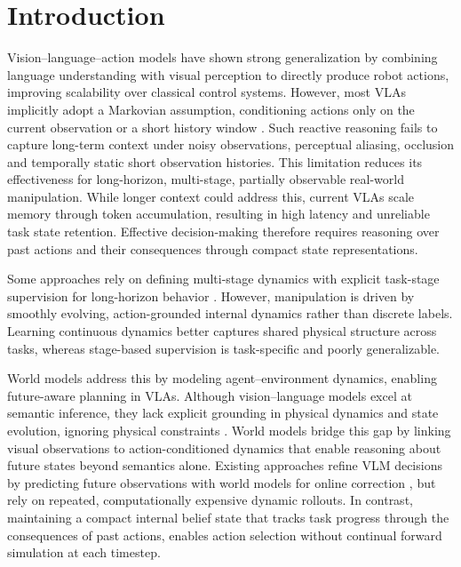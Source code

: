 \documentclass[conference]{IEEEtran}
\begin{document}
\section{Introduction}
Vision–language–action models \cite{kim2024openvla,ye2025vla,zitkovich2023rt} have shown strong generalization by combining language understanding with visual perception to directly produce robot actions, improving scalability over classical control systems. However, most VLAs implicitly adopt a Markovian assumption, conditioning actions only on the current observation or a short history window \cite{jang2025contextvla,lin2025hif,wang2025lola}. Such reactive reasoning fails to capture long-term context under noisy observations, perceptual aliasing, occlusion and temporally static short observation histories. This limitation reduces its effectiveness for long-horizon, multi-stage, partially observable real-world manipulation. While longer context could address this, current VLAs scale memory through token accumulation, resulting in high latency and unreliable task state retention. Effective decision-making therefore requires reasoning over past actions and their consequences through compact state representations. 

Some approaches rely on defining multi-stage dynamics with explicit task-stage supervision for long-horizon behavior \cite{xu2025stare,ji2025robobrain}. However, manipulation is driven by smoothly evolving, action-grounded internal dynamics rather than discrete labels. Learning continuous dynamics better captures shared physical structure across tasks, whereas stage-based supervision is task-specific and poorly generalizable.

World models \cite{chen2022transdreamer} address this by modeling agent–environment dynamics, enabling future-aware planning in VLAs.
Although vision–language models excel at semantic inference, they lack explicit grounding in physical dynamics and state evolution, ignoring physical constraints \cite{gao2025vision}. World models bridge this gap by linking visual observations to action-conditioned dynamics that enable reasoning about future states beyond semantics alone. Existing approaches refine VLM decisions by predicting future observations with world models for online correction \cite{feng2025reflective,wang2025vagen,cen2025worldvla}, but rely on repeated, computationally expensive dynamic rollouts. In contrast, maintaining a compact internal belief state that tracks task progress through the consequences of past actions, enables action selection without continual forward simulation at each timestep. 
\end{document}
